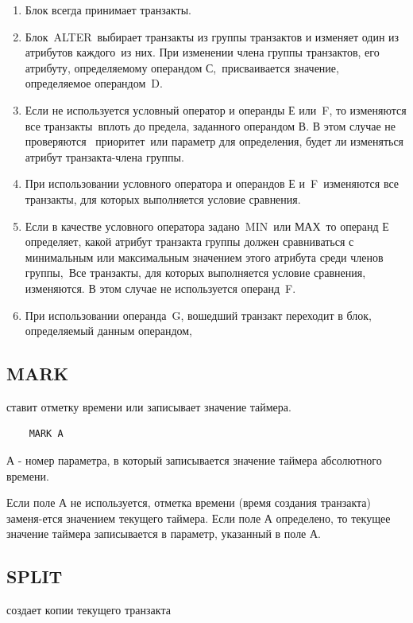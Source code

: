 \documentclass[14pt]{extarticle}
\begin{document}
\begin{enumerate}
	\item Блок всегда принимает транзакты.
	\item Блок ALTER выбирает транзакты из группы транзактов и изменяет один из атрибутов каждого из них. При изменении члена группы транзактов, его атрибуту, определяемому операндом С, присваивается значение, определяемое операндом D.
	\item Если не используется условный оператор и операнды Е или F, то изменяются все транзакты вплоть до предела, заданного операндом В. В этом случае не проверяются  приоритет или параметр для определения, будет ли изменяться атрибут транзакта-члена группы.
	\item При использовании условного оператора и операндов Е и F изменяются все транзакты, для которых выполняется условие сравнения.
	\item Если в качестве условного оператора задано MIN или МАХ то операнд Е определяет, какой атрибут транзакта группы должен сравниваться с минимальным или максимальным значением этого атрибута среди членов группы, Все транзакты, для которых выполняется условие сравнения, изменяются. В этом случае не используется операнд F.
	\item При использовании операнда G, вошедший транзакт переходит в блок, определяемый данным операндом,
\end{enumerate}

\subsection*{MARK}

ставит отметку времени или записывает значение таймера.

\begin{lstlisting}
	MARK A
\end{lstlisting}

А - номер параметра, в который записывается значение таймера абсолютного времени.

Если поле А не используется, отметка времени (время создания транзакта) заменя-ется значением текущего таймера. Если поле А определено, то текущее значение таймера записывается в параметр, указанный в поле А.

\subsection*{SPLIT}

создает копии текущего транзакта
\end{document}

